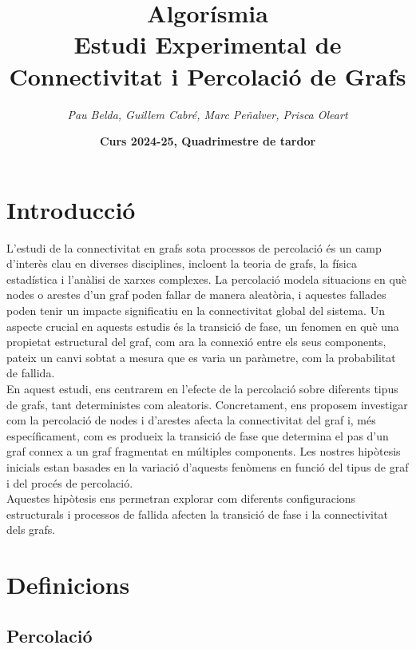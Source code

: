\documentclass[a4paper]{article}
\title{\textbf{\huge Algorísmia}\\[0.5cm]
	\textbf{\Large Estudi Experimental de Connectivitat i Percolació de Grafs}}
\author{\emph{Pau Belda, Guillem Cabré, Marc Peñalver, Prisca Oleart}}
\date{\textbf{Curs 2024-25, Quadrimestre de tardor}}
\begin{document}
	
	\begin{titlepage}
		\clearpage\maketitle
		\thispagestyle{empty}
	\end{titlepage}
	
	\tableofcontents
	\clearpage

	\section{Introducció}

	L'estudi de la connectivitat en grafs sota processos de percolació és un camp d'interès clau en diverses disciplines, incloent la teoria de grafs, la física estadística i l'anàlisi de xarxes complexes. La percolació modela situacions en què nodes o arestes d'un graf poden fallar de manera aleatòria, i aquestes fallades poden tenir un impacte significatiu en la connectivitat global del sistema. Un aspecte crucial en aquests estudis és la transició de fase, un fenomen en què una propietat estructural del graf, com ara la connexió entre els seus components, pateix un canvi sobtat a mesura que es varia un paràmetre, com la probabilitat de fallida. \\
	
	En aquest estudi, ens centrarem en l'efecte de la percolació sobre diferents tipus de grafs, tant deterministes com aleatoris. Concretament, ens proposem investigar com la percolació de nodes i d'arestes afecta la connectivitat del graf i, més específicament, com es produeix la transició de fase que determina el pas d'un graf connex a un graf fragmentat en múltiples components. Les nostres hipòtesis inicials estan basades en la variació d'aquests fenòmens en funció del tipus de graf i del procés de percolació. \\
	
	Aquestes hipòtesis ens permetran explorar com diferents configuracions estructurals i processos de fallida afecten la transició de fase i la connectivitat dels grafs. \\
	
	\newpage
	
	\section{Definicions}
		
	\subsection{Percolació}
	
\end{document}
